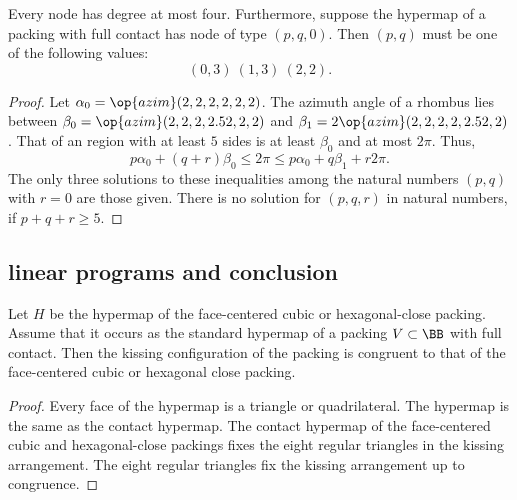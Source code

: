 \begin{lemma}\label{lemma:no-5} 
  Every node has degree at most four.  Furthermore, suppose the
  hypermap of a  packing with full contact has node of type
  $(p,q,0)$.  Then $(p,q)$ must be one of the following values:
\begin{displaymath}
(0,3)~(1,3)~(2,2).
\end{displaymath}
\end{lemma}

\begin{proof} Let $\alpha_0 = \op{azim}(2,2,2,2,2,2)$.  The azimuth
  angle of a rhombus lies between $\beta_0 =
  \op{azim}(2,2,2,2.52,2,2)$ and $\beta_1 =
  2\op{azim}(2,2,2,2,2.52,2)$.  That of an region with at least $5$
  sides is at least $\beta_0$ and at most $2\pi$.  Thus,
\begin{displaymath}
p\alpha_0 + (q+r) \beta_0 \le 2\pi \le p\alpha_0 + q\beta_1 + r 2\pi.
\end{displaymath}
The only three solutions to these inequalities among the natural
numbers $(p,q)$ with $r=0$ are those given. There is no solution for
$(p,q,r)$ in natural numbers, if $p+q+r\ge 5$.
\end{proof}





\subsection{linear programs and conclusion}

\begin{lemma}\label{lemma:kiss-fcc} Let $H$ be the
  hypermap of the face-centered cubic or hexagonal-close packing.
  Assume that it occurs as the standard hypermap of a  packing $V\subset \BB$
  with full contact.  Then the kissing configuration of the 
  packing is congruent to that of the face-centered cubic or hexagonal
  close packing.
\end{lemma}
%
%
%
%
%

\begin{proof} Every face of the hypermap is a triangle or
  quadrilateral.  The hypermap is the same as the contact hypermap.
  The contact hypermap of the face-centered cubic and hexagonal-close
  packings fixes the eight regular triangles in the kissing
  arrangement.  The eight regular triangles fix the kissing
  arrangement up to congruence.
\end{proof}

